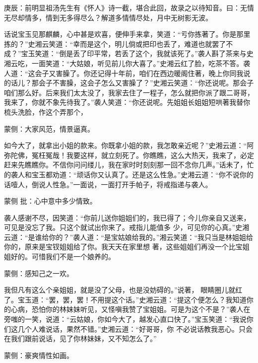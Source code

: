

\begin{parag}
    \begin{note}庚辰：前明显祖汤先生有《怀人》诗一截，堪合此回，故录之以待知音。曰：无情无尽却情多，情到无多得尽么？解道多情情尽处，月中无树影无波。\end{note}
\end{parag}


\begin{parag}
    话说宝玉见那麒麟，心中甚是欢喜，便伸手来拿，笑道：“亏你拣著了。你是那里拣的？”史湘云笑道：“幸而是这个，明儿倘或把印也丢了，难道也就罢了不 成？”宝玉笑道：“倒是丢了印平常，若丢了这个，我就该死了。”袭人斟了茶来与史湘云吃，一面笑道：“大姑娘，听见前儿你大喜了。”史湘云红了脸，吃茶不答。袭人道：“这会子又害臊了。你还记得十年前，咱们在西边暖阁住著，晚上你同我说的话儿？那会子不害臊，这会子怎么又害臊了？”史湘云笑道：“你还说呢。那会子咱们那么好。后来我们太太没了，我家去住了一程子，怎么就把你派了跟二哥哥，我来了，你就不象先待我了。”袭人笑道：“你还说呢。先姐姐长姐姐短哄著我替你梳头洗脸，作这个弄那个，\begin{note}蒙侧：大家风范，情景逼真。\end{note}如今大了，就拿出小姐的款来。你既拿小姐的款，我怎敢亲近呢？”史湘云道：“阿弥陀佛，冤枉冤哉！我要这样，就立刻死了。你瞧瞧，这么大热天，我来了，必定赶来先瞧瞧你。不信你问问缕儿，我在家时时刻刻那一回不念你几声。”话未了，忙的袭人和宝玉都劝道：“顽话你又认真了。还是这么性急。”史湘云道：“你不说你的话噎人，倒说人性急。”一面说，一面打开手帕子，将戒指递与袭人。\begin{note}蒙侧 批：心中意中多少情致。\end{note}袭人感谢不尽，因笑道：“你前儿送你姐姐们的，我已得了；今儿你亲自又送来，可见是没忘了我。只这个就试出你来了。戒指儿能值多 少，可见你的心真。”史湘云道：“是谁给你的？”袭人道：“是宝姑娘给我的。”湘云笑道：“我只当是林姐姐给你的，原来是宝钗姐姐给了你。我天天在家里想 著，这些姐姐们再没一个比宝姐姐好的。可惜我们不是一个娘养的。\begin{note}蒙侧：感知己之一欢。\end{note}我但凡有这么个亲姐姐，就是没了父母，也是没妨碍的。”说著， 眼睛圈儿就红了。宝玉道：“罢，罢，罢！不用提这个话。”史湘云道：“提这个便怎么？我知道你的心病，恐怕你的林妹妹听见，又怪嗔我赞了宝姐姐。可是为这个不是？”袭人在旁嗤的一笑，说道：“云姑娘，你如今大了，越发心直口快了。”宝玉笑道：“我说你们这几个人难说话，果然不错。”史湘云道：“好哥哥，你 不必说话教我恶心。只会在我们跟前说话，见了你林妹妹，又不知怎么了。”\begin{note}蒙侧：豪爽情性如画。\end{note}
\end{parag}


